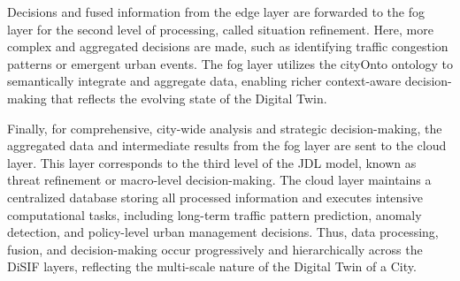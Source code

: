 \documentclass[5p,times]{elsarticle}
\begin{document}
Decisions and fused information from the edge layer are forwarded to 
the fog layer for the second level of processing, called situation refinement.
 Here, more complex and aggregated decisions are made, such as identifying traffic
  congestion patterns or emergent urban events. The fog layer utilizes the cityOnto ontology
   to semantically integrate and aggregate data, enabling richer context-aware decision-making 
   that reflects the evolving state of the Digital Twin.

Finally, for comprehensive, city-wide analysis and strategic decision-making, 
the aggregated data and intermediate results from the fog layer are sent to the cloud layer.
 This layer corresponds to the third level of the JDL model, known as threat refinement
  or macro-level decision-making. The cloud layer maintains a centralized database storing all
   processed information and executes intensive computational tasks, including long-term traffic
    pattern prediction, anomaly detection, and policy-level urban management decisions.
     Thus, data processing, fusion, and decision-making occur progressively and hierarchically 
     across the DiSIF layers, reflecting the multi-scale nature of the Digital Twin of a City.











\end{document}
